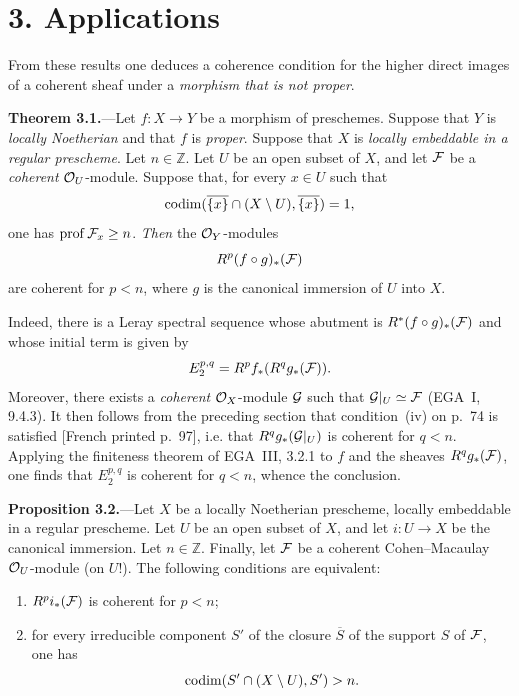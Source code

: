 \section*{3. Applications}

\noindent From these results one deduces a coherence condition for the higher
direct images of a coherent sheaf under a \emph{morphism that is not proper}.

\medskip
{}\noindent\textbf{Theorem 3.1.}---Let $f\colon X\to Y$ be a morphism of
preschemes. Suppose that $Y$ is \emph{locally Noetherian} and that $f$ is
\emph{proper}. Suppose that $X$ is \emph{locally embeddable in a regular
prescheme}. Let $n\in\mathbb Z$. Let $U$ be an open subset of $X$, and let
$\cF$ be a \emph{coherent} $\mathcal O_U$-module. Suppose that, for every $x\in U$
such that
\[
  \operatorname{codim}(\overline{\{x\}}\cap(X\setminus U),
  \overline{\{x\}})=1,
\]
one has $\prof\cF_x\geq n$. \emph{Then} the $\mathcal O_Y$-modules
\[
  R^p(f\circ g)_*(\cF)
\]
are coherent for $p<n$, where $g$ is the canonical immersion of $U$ into
$X$.

\medskip
\noindent Indeed, there is a Leray spectral sequence whose abutment is
$R^*(f\circ g)_*(\cF)$ and whose initial term is given by
\[
  E_2^{p,q}=R^p f_*(R^q g_*(\cF)).
\]
Moreover, there exists a \emph{coherent} $\mathcal O_X$-module $\mathcal G$ such that
$\cG|_U\simeq\cF$ (EGA~I, 9.4.3). It then follows from the preceding section
that condition~\textup{(iv)} on p.~74 is satisfied
{\scriptsize\color{gray}[French printed p.~97]}, i.e. that
$R^q g_*(\mathcal G|_U)$ is coherent for $q<n$. Applying the finiteness theorem of
EGA~III, 3.2.1 to $f$ and the sheaves $R^q g_*(\cF)$, one finds that
$E_2^{p,q}$ is coherent for $q<n$, whence the conclusion.


\medskip
{}\noindent\textbf{Proposition 3.2.}---Let $X$ be a locally Noetherian
prescheme, locally embeddable in a regular prescheme. Let $U$ be an open
subset of $X$, and let $i\colon U\to X$ be the canonical immersion. Let
$n\in\mathbb Z$. Finally, let $\cF$ be a coherent Cohen--Macaulay
$\mathcal O_U$-module (on $U$!). The following conditions are equivalent:
\begin{enumerate}
\item[(a)] $R^p i_*(\cF)$ is coherent for $p<n$;
\item[(b)] for every irreducible component $S'$ of the closure $\overline S$
of the support $S$ of $\cF$, one has
\[
  \operatorname{codim}(S'\cap(X\setminus U),S')>n.
\]
\end{enumerate}


